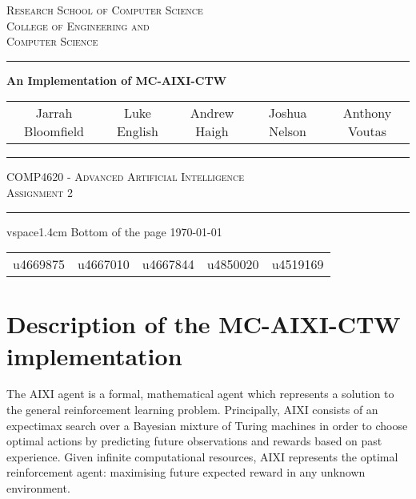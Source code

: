 \documentclass[pdftex,twoside,a4paper]{report}
\begin{document}
\begin{titlepage}
\renewcommand*{\thefootnote}{\fnsymbol{footnote}}
\begin{center}

\textsc{\Large Research School of Computer Science}\\[0.5cm]
\textsc{\Large College of Engineering and}\\[0.2cm]
\textsc{\Large Computer Science}\\[0.5cm]
\vspace{1.4cm}
\hrule
\vspace{1.4cm}
{\huge \bfseries An Implementation of MC-AIXI-CTW} \\
\vspace{0.4cm}


\begin{tabular}{ccccc}
  Jarrah Bloomfield\footnotemark &
  Luke English\footnotemark &
  Andrew Haigh\footnotemark &
  Joshua Nelson\footnotemark &
  Anthony Voutas\footnotemark
\end{tabular}

\vspace{1.4cm}
\hrule
\vspace{1.0cm}
\textsc{\large COMP4620 - Advanced Artificial Intelligence}\\
\textsc{Assignment 2}\\
\vspace{1.0cm}
\hrule
vspace{1.4cm}
\vfill
Bottom of the page
{\large \today} \\[0.5cm]

\begin{tabular}{ccccc}
  \setcounter{footnote}{0}
  u4669875\footnotemark &
  u4667010\footnotemark &
  u4667844\footnotemark &
  u4850020\footnotemark &
  u4519169\footnotemark
\end{tabular}
\end{center}
 
\end{titlepage}
\chapter{Description of the MC-AIXI-CTW implementation}

The AIXI agent is a formal, mathematical agent which represents a solution to
the general reinforcement learning problem. Principally, AIXI consists of an
expectimax search over a Bayesian mixture of Turing machines in order to
choose optimal actions by predicting future observations and rewards based on
past experience. Given infinite computational resources, AIXI represents the
optimal reinforcement agent: maximising future expected reward in any unknown
environment.
\end{document}
